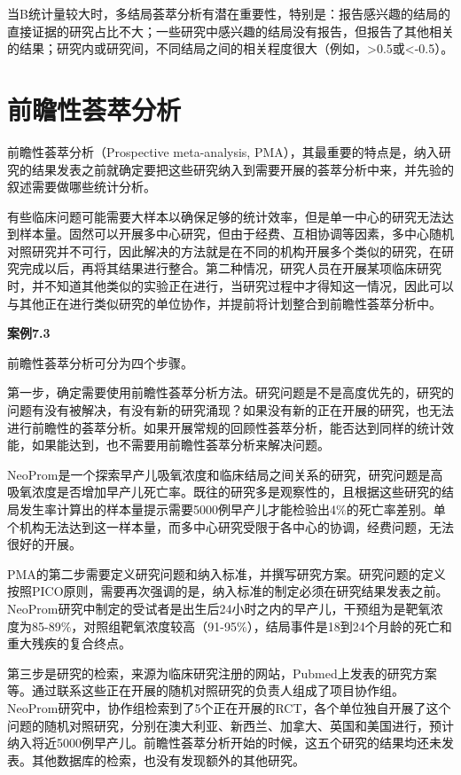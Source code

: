 \documentclass[
  chinese-hans,
  letterpaper,
  DIV=11,
  numbers=noendperiod]{scrreprt}
\begin{document}
当B统计量较大时，多结局荟萃分析有潜在重要性，特别是：报告感兴趣的结局的直接证据的研究占比不大；一些研究中感兴趣的结局没有报告，但报告了其他相关的结果；研究内或研究间，不同结局之间的相关程度很大（例如，\textgreater0.5或\textless-0.5）。

\section{前瞻性荟萃分析}\label{ux524dux77bbux6027ux835fux8403ux5206ux6790}

前瞻性荟萃分析（Prospective meta-analysis,
PMA），其最重要的特点是，纳入研究的结果发表之前就确定要把这些研究纳入到需要开展的荟萃分析中来，并先验的叙述需要做哪些统计分析。

有些临床问题可能需要大样本以确保足够的统计效率，但是单一中心的研究无法达到样本量。固然可以开展多中心研究，但由于经费、互相协调等因素，多中心随机对照研究并不可行，因此解决的方法就是在不同的机构开展多个类似的研究，在研究完成以后，再将其结果进行整合。第二种情况，研究人员在开展某项临床研究时，并不知道其他类似的实验正在进行，当研究过程中才得知这一情况，因此可以与其他正在进行类似研究的单位协作，并提前将计划整合到前瞻性荟萃分析中。

\textbf{案例7.3}

前瞻性荟萃分析可分为四个步骤。

第一步，确定需要使用前瞻性荟萃分析方法。研究问题是不是高度优先的，研究的问题有没有被解决，有没有新的研究涌现？如果没有新的正在开展的研究，也无法进行前瞻性的荟萃分析。如果开展常规的回顾性荟萃分析，能否达到同样的统计效能，如果能达到，也不需要用前瞻性荟萃分析来解决问题。

NeoProm是一个探索早产儿吸氧浓度和临床结局之间关系的研究，研究问题是高吸氧浓度是否增加早产儿死亡率。既往的研究多是观察性的，且根据这些研究的结局发生率计算出的样本量提示需要5000例早产儿才能检验出4\%的死亡率差别。单个机构无法达到这一样本量，而多中心研究受限于各中心的协调，经费问题，无法很好的开展。

PMA的第二步需要定义研究问题和纳入标准，并撰写研究方案。研究问题的定义按照PICO原则，需要再次强调的是，纳入标准的制定必须在研究结果发表之前。NeoProm研究中制定的受试者是出生后24小时之内的早产儿，干预组为是靶氧浓度为85-89\%，对照组靶氧浓度较高（91-95\%），结局事件是18到24个月龄的死亡和重大残疾的复合终点。

第三步是研究的检索，来源为临床研究注册的网站，Pubmed上发表的研究方案等。通过联系这些正在开展的随机对照研究的负责人组成了项目协作组。NeoProm研究中，协作组检索到了5个正在开展的RCT，各个单位独自开展了这个问题的随机对照研究，分别在澳大利亚、新西兰、加拿大、英国和美国进行，预计纳入将近5000例早产儿。前瞻性荟萃分析开始的时候，这五个研究的结果均还未发表。其他数据库的检索，也没有发现额外的其他研究。
\end{document}
